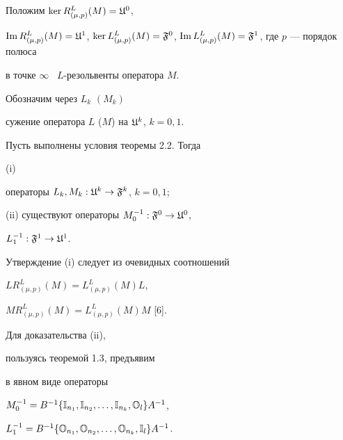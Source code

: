 Положим $\ker R^L_{(\mu, p)} (M) = {\frak U}^0$,


$\im R^L_{(\mu, p)} (M) = {\frak U}^1$, $\ker L^L_{(\mu,


p)} (M) = {\frak F}^0$, $\im L^L_{(\mu, p)}


(M) = {\frak F}^1$, где $p$ --- порядок полюса


в точке $\infty$ \ $L$-резольвенты оператора $M$.


Обозначим через $L_k$ $(M_k)$


сужение оператора $L$ ($M$) на ${\frak U}^k$, $k=0,1$.





\begin{cors}


Пусть выполнены условия теоремы 2.2. Тогда





(i)


операторы $L_k, M_k : {\frak U}^k\to {\frak F}^k$, $k=0,1$;





(ii) существуют операторы $M_0^{-1} : {\frak F}^0\to {\frak U}^0$,


$L_1^{-1} : {\frak F}^1\to{\frak U}^1$.


\end{cors}





\begin{pf}


Утверждение (i) следует из очевидных соотношений


$L R^L_{(\mu, p)} (M) =$\linebreak $L^L_{(\mu, p)} (M) L$, %


$M R^L_{(\mu, p)} (M) = L^L_{(\mu, p)} (M) M$ [6].





Для доказательства (ii),


пользуясь теоремой 1.3, предъявим 


в явном виде операторы


$M_0^{-1} = B^{-1}\{{\Bbb I}_{n_1}, {\Bbb I}_{n_2},\dotsc,


{\Bbb I}_{n_k}, {\Bbb O}_l\} A^{-1}$,


$L_1^{-1} = B^{-1} \{{\Bbb O}_{n_1}, {\Bbb O}_{n_2},\dotsc,{\Bbb O}_{n_k},


{\Bbb I}_l\} A^{-1}$.


\end{pf}





